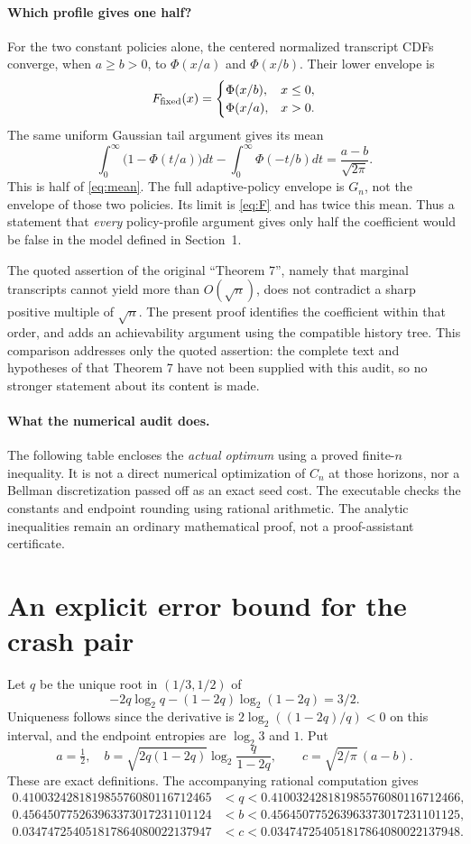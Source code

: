 \documentclass[11pt,a4paper]{article}
\begin{document}
\paragraph{Which profile gives one half?}
For the two constant policies alone, the centered normalized transcript
CDFs converge, when $a\ge b>0$, to $\Phi(x/a)$ and $\Phi(x/b)$.
Their lower envelope is
\[
F_{\rm fixed}(x)=
\begin{cases}\Phi(x/b),&x\le0,\\\Phi(x/a),&x>0.\end{cases}
\]
The same uniform Gaussian tail argument gives its mean
\[
\int_0^\infty\bigl(1-\Phi(t/a)\bigr)dt
-\int_0^\infty\Phi(-t/b)dt
=\frac{a-b}{\sqrt{2\pi}}.
\]
This is half of \eqref{eq:mean}. The full adaptive-policy envelope
is $G_n$, not the envelope of those two policies. Its limit is
\eqref{eq:F} and has twice this mean. Thus a statement that
\emph{every} policy-profile argument gives only half the coefficient
would be false in the model defined in Section~1.

The quoted assertion of the original ``Theorem 7'', namely that
marginal transcripts cannot yield more than $O(\sqrt n)$, does not
contradict a sharp positive multiple of $\sqrt n$. The present proof
identifies the coefficient within that order, and adds an achievability
argument using the compatible history tree. This comparison addresses
only the quoted assertion: the complete text and hypotheses of that
Theorem 7 have not been supplied with this audit, so no stronger
statement about its content is made.

\paragraph{What the numerical audit does.}
The following table encloses the \emph{actual optimum} using a proved
finite-$n$ inequality. It is not a direct numerical optimization of
$C_n$ at those horizons, nor a Bellman discretization passed off as an
exact seed cost. The executable checks the constants and endpoint
rounding using rational arithmetic. The analytic inequalities remain
an ordinary mathematical proof, not a proof-assistant certificate.

\section{An explicit error bound for the crash pair}\label{sec:finite}
Let $q$ be the unique root in $(1/3,1/2)$ of
\[
-2q\log_2q-(1-2q)\log_2(1-2q)=3/2.
\]
Uniqueness follows since the derivative is
$2\log_2((1-2q)/q)<0$ on this interval, and the endpoint entropies
are $\log_2 3$ and $1$. Put
\[
a=\tfrac12,\quad b=\sqrt{2q(1-2q)}\log_2\frac q{1-2q},
\qquad c=\sqrt{2/\pi}\,(a-b).
\]
These are exact definitions. The accompanying rational computation gives
\begin{align*}
0.410032428181985576080116712465
&<q<0.410032428181985576080116712466,\\
0.456450775263963373017231101124
&<b<0.456450775263963373017231101125,\\
0.034747254051817864080022137947
&<c<0.034747254051817864080022137948.
\end{align*}
\end{document}

